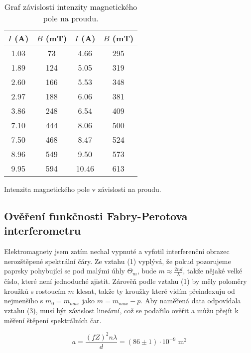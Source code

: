 \documentclass[a4paper,11pt]{article}
\begin{document}
\begin{table}[htpb]
    \begin{minipage}{.45\linewidth}
    \centering
    \begin{tabular}{|c c|c c|}
        \hline
        $I$ (A) & $B$ (mT) & $I$ (A) & $B$ (mT) \\
        \hline
        1.03 & 73 & 4.66 & 295 \\
        1.89 & 124 & 5.05 & 319 \\
        2.60 & 166 & 5.53 & 348 \\
        2.97 & 188 & 6.06 & 381 \\
        3.86 & 248 & 6.54 & 409 \\
        7.10 & 444 & 8.06 & 500 \\
        7.50 & 468 & 8.47 & 524 \\
        8.96 & 549 & 9.50 & 573 \\
        9.95 & 594 & 10.46 & 613 \\
        \hline
    \end{tabular}
    \caption{Intenzita magnetického pole v závislosti na proudu. }
    \end{minipage} 
    \hfill
    \begin{minipage}{.5\linewidth}
        \centering
        \resizebox{\textwidth}{!}{  }
        \captionsetup{type=graph}
        \caption{Graf závislosti intenzity magnetického pole na proudu. }
    \end{minipage} 
\end{table}

\subsection{Ověření funkčnosti Fabry-Perotova interferometru}

Elektromagnety jsem zatím nechal vypnuté a vyfotil interferenční obrazec nerozštěpené spektrální čáry. Ze vztahu (1) vyplývá, že pokud pozorujeme paprsky pohybující se pod malými úhly $ \Theta_m $, bude $ m \approx \frac{2nd}{\lambda} $, takže nějaké velké  číslo, které není jednoduché zjistit. Zárověň podle vztahu (1) by měly poloměry kroužků s rostoucím $ m $ klesat, takže ty kroužky které vidím přeindexuju od nejmenšího s $ m_0 = m_{max} $  jako $ m = m_{max} - p $.  
Aby naměřená data odpovídala vztahu (3), musí být závislost lineární, což se podařilo ověřit a můžu přejít k měření štěpení spektrálních čar. 

\begin{equation}
    a = \frac{(fZ)^2n \lambda}{d} = (86 \pm 1) \cdot 10^{-9} \text{ m}^2
\end{equation}
\end{document}
